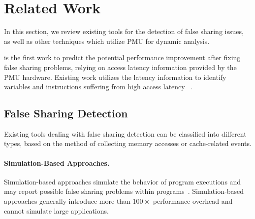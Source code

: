 \section{Related Work}

\label{sec:relatedwork}

 

In this section, we review existing tools for the detection of false sharing issues, as well as other techniques which utilize PMU for dynamic analysis.

\cheetah{} is the first work to predict the potential performance improvement after fixing false sharing problems, relying on access latency information provided by the PMU hardware. Existing work utilizes the latency information to identify variables and instructions suffering from high access latency ~\cite{ibs-sc, ibs-pact}. 

\subsection{False Sharing Detection}

Existing tools dealing with false sharing detection can be classified into different types, based on the method of collecting memory accesses or cache-related events. 

\paragraph{Simulation-Based Approaches.} Simulation-based approaches simulate the behavior of program executions and may report possible false sharing problems within programs~\cite{falseshare:simulator}. Simulation-based approaches generally introduce more than $100\times$ performance overhead and cannot simulate large applications. 


